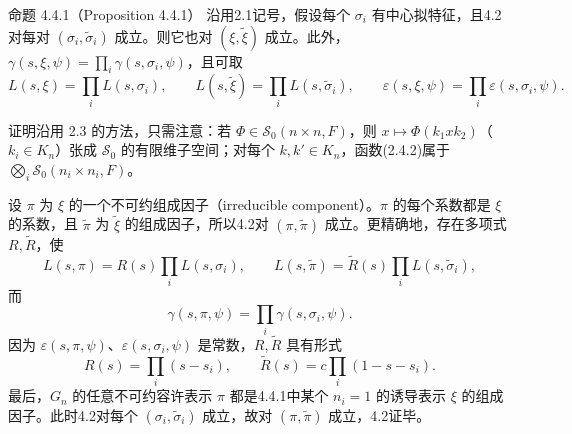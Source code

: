 \begin{originaltheorem}{命题 4.4.1（Proposition 4.4.1）}
沿用2.1记号，假设每个 $\sigma_i$ 有中心拟特征，且4.2对每对 $(\sigma_i,\widetilde\sigma_i)$ 成立。则它也对 $(\xi,\widetilde\xi)$ 成立。此外，$\gamma(s,\xi,\psi)=\prod_i\gamma(s,\sigma_i,\psi)$，且可取
\[
 L(s,\xi)=\prod_iL(s,\sigma_i),\qquad
 L(s,\widetilde\xi)=\prod_iL(s,\widetilde\sigma_i),
 \qquad\varepsilon(s,\xi,\psi)=\prod_i\varepsilon(s,\sigma_i,\psi).
\]
\end{originaltheorem}
证明沿用 2.3 的方法，只需注意：若 $\Phi\in\mathcal S_0(n\times n,F)$，则 $x\mapsto\Phi(k_1xk_2)$（$k_i\in K_n$）张成 $\mathcal S_0$ 的有限维子空间；对每个 $k,k'\in K_n$，函数(2.4.2)属于 $\bigotimes_i\mathcal S_0(n_i\times n_i,F)$。

设 $\pi$ 为 $\xi$ 的一个不可约组成因子（irreducible component）。$\pi$ 的每个系数都是 $\xi$ 的系数，且 $\widetilde\pi$ 为 $\widetilde\xi$ 的组成因子，所以4.2对 $(\pi,\widetilde\pi)$ 成立。更精确地，存在多项式 $R,\widetilde R$，使
\[
 L(s,\pi)=R(s)\prod_iL(s,\sigma_i),\qquad
 L(s,\widetilde\pi)=\widetilde R(s)\prod_iL(s,\widetilde\sigma_i),\tag{4.4.2}
\]
而
\[
 \gamma(s,\pi,\psi)=\prod_i\gamma(s,\sigma_i,\psi).\tag{4.4.3}
\]
因为 $\varepsilon(s,\pi,\psi)$、$\varepsilon(s,\sigma_i,\psi)$ 是常数，$R,\widetilde R$ 具有形式
\[
 R(s)=\prod_i(s-s_i),\qquad
 \widetilde R(s)=c\prod_i(1-s-s_i).\tag{4.4.4}
\]
最后，$G_n$ 的任意不可约容许表示 $\pi$ 都是4.4.1中某个 $n_i=1$ 的诱导表示 $\xi$ 的组成因子。此时4.2对每个 $(\sigma_i,\widetilde\sigma_i)$ 成立，故对 $(\pi,\widetilde\pi)$ 成立，4.2证毕。

